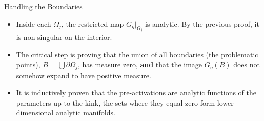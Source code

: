 \documentclass[10pt, aspectratio=169]{beamer}
\theoremstyle{definition}
\begin{document}
\begin{frame}{Handling the Boundaries}
    \begin{itemize}
        \item Inside each $\Omega_j$, the restricted map $G_\eta|_{\Omega_j}$ is analytic. By the previous proof, it is non-singular on the interior.
        \item The critical step is proving that the union of all boundaries (the problematic points), $B = \bigcup \partial \Omega_j$, has measure zero, \textbf{and} that the image $G_\eta(B)$ does not somehow expand to have positive measure.
        \item It is inductively proven that the pre-activations are analytic functions of the parameters up to the kink, the sets where they equal zero form lower-dimensional analytic manifolds.
    \end{itemize}
\end{frame}
\end{document}
